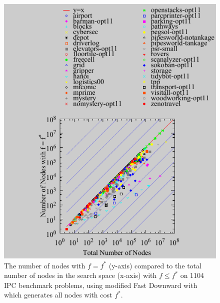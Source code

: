 
\begin{figure}[htbp]
  \centering
  \includegraphics{tables/aaai16-frontier/aaai16prelim3/lmcut_frontier_noh-front.pdf}
 \caption{
 The number of nodes with $f=f^*$ (y-axis) compared to the
 total number of nodes in the search space (x-axis) with $f\leq f^*$ on 1104 IPC benchmark problems,
  using modified Fast Downward with \lmcut which 
  generates all nodes with cost $f^*$.
  }
 \label{fig:plateau-noh}
\end{figure}

